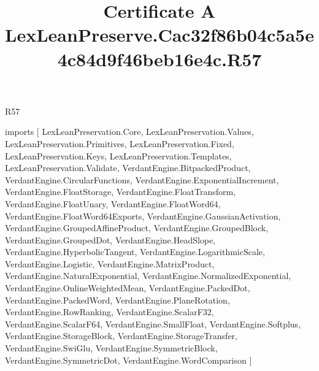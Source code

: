 \begin{lexlean}{R57}
\title{Certificate A LexLeanPreserve.Cac32f86b04c5a5e4c84d9f46beb16e4c.R57}
\begin{coremodule}
imports [
  LexLeanPreservation.Core,
  LexLeanPreservation.Values,
  LexLeanPreservation.Primitives,
  LexLeanPreservation.Fixed,
  LexLeanPreservation.Keys,
  LexLeanPreservation.Templates,
  LexLeanPreservation.Validate,
  VerdantEngine.BitpackedProduct,
  VerdantEngine.CircularFunctions,
  VerdantEngine.ExponentialIncrement,
  VerdantEngine.FloatStorage,
  VerdantEngine.FloatTransform,
  VerdantEngine.FloatUnary,
  VerdantEngine.FloatWord64,
  VerdantEngine.FloatWord64Exports,
  VerdantEngine.GaussianActivation,
  VerdantEngine.GroupedAffineProduct,
  VerdantEngine.GroupedBlock,
  VerdantEngine.GroupedDot,
  VerdantEngine.HeadSlope,
  VerdantEngine.HyperbolicTangent,
  VerdantEngine.LogarithmicScale,
  VerdantEngine.Logistic,
  VerdantEngine.MatrixProduct,
  VerdantEngine.NaturalExponential,
  VerdantEngine.NormalizedExponential,
  VerdantEngine.OnlineWeightedMean,
  VerdantEngine.PackedDot,
  VerdantEngine.PackedWord,
  VerdantEngine.PlaneRotation,
  VerdantEngine.RowRanking,
  VerdantEngine.ScalarF32,
  VerdantEngine.ScalarF64,
  VerdantEngine.SmallFloat,
  VerdantEngine.Softplus,
  VerdantEngine.StorageBlock,
  VerdantEngine.StorageTransfer,
  VerdantEngine.SwiGlu,
  VerdantEngine.SymmetricBlock,
  VerdantEngine.SymmetricDot,
  VerdantEngine.WordComparison
]


\end{coremodule}
\end{lexlean}
